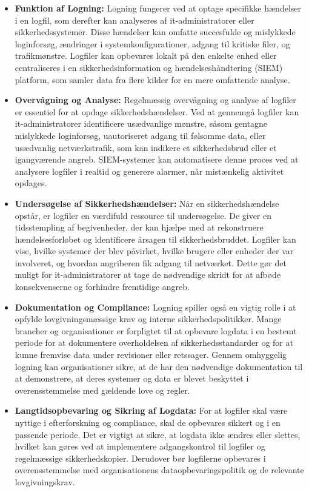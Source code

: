 \begin{itemize}
	\item \textbf{Funktion af Logning:} Logning fungerer ved at optage specifikke hændelser i en logfil, som derefter kan analyseres af it-administratorer eller sikkerhedssystemer. Disse hændelser kan omfatte succesfulde og mislykkede loginforsøg, ændringer i systemkonfigurationer, adgang til kritiske filer, og trafikmønstre. Logfiler kan opbevares lokalt på den enkelte enhed eller centraliseres i en sikkerhedsinformation og hændelseshåndtering (SIEM) platform, som samler data fra flere kilder for en mere omfattende analyse.
	
	\item \textbf{Overvågning og Analyse:} Regelmæssig overvågning og analyse af logfiler er essentiel for at opdage sikkerhedshændelser. Ved at gennemgå logfiler kan it-administratorer identificere usædvanlige mønstre, såsom gentagne mislykkede loginforsøg, uautoriseret adgang til følsomme data, eller usædvanlig netværkstrafik, som kan indikere et sikkerhedsbrud eller et igangværende angreb. SIEM-systemer kan automatisere denne proces ved at analysere logfiler i realtid og generere alarmer, når mistænkelig aktivitet opdages.
	
	\item \textbf{Undersøgelse af Sikkerhedshændelser:} Når en sikkerhedshændelse opstår, er logfiler en værdifuld ressource til undersøgelse. De giver en tidsstempling af begivenheder, der kan hjælpe med at rekonstruere hændelsesforløbet og identificere årsagen til sikkerhedsbruddet. Logfiler kan vise, hvilke systemer der blev påvirket, hvilke brugere eller enheder der var involveret, og hvordan angriberen fik adgang til netværket. Dette gør det muligt for it-administratorer at tage de nødvendige skridt for at afbøde konsekvenserne og forhindre fremtidige angreb.
	
	\item \textbf{Dokumentation og Compliance:} Logning spiller også en vigtig rolle i at opfylde lovgivningsmæssige krav og interne sikkerhedspolitikker. Mange brancher og organisationer er forpligtet til at opbevare logdata i en bestemt periode for at dokumentere overholdelsen af sikkerhedsstandarder og for at kunne fremvise data under revisioner eller retssager. Gennem omhyggelig logning kan organisationer sikre, at de har den nødvendige dokumentation til at demonstrere, at deres systemer og data er blevet beskyttet i overensstemmelse med gældende love og regler.
	
	\item \textbf{Langtidsopbevaring og Sikring af Logdata:} For at logfiler skal være nyttige i efterforskning og compliance, skal de opbevares sikkert og i en passende periode. Det er vigtigt at sikre, at logdata ikke ændres eller slettes, hvilket kan gøres ved at implementere adgangskontrol til logfiler og regelmæssige sikkerhedskopier. Derudover bør logfilerne opbevares i overensstemmelse med organisationens dataopbevaringspolitik og de relevante lovgivningskrav.
	
\end{itemize}

